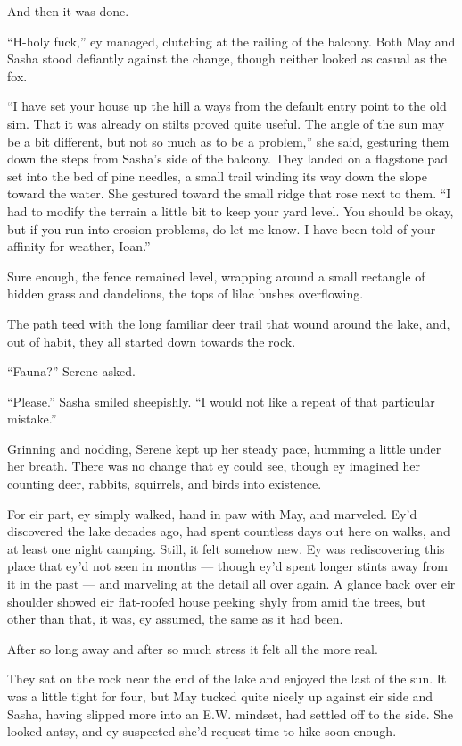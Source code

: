 And then it was done.

``H-holy fuck,'' ey managed, clutching at the railing of the balcony. Both May and Sasha stood defiantly against the change, though neither looked as casual as the fox.

``I have set your house up the hill a ways from the default entry point to the old sim. That it was already on stilts proved quite useful. The angle of the sun may be a bit different, but not so much as to be a problem,'' she said, gesturing them down the steps from Sasha's side of the balcony. They landed on a flagstone pad set into the bed of pine needles, a small trail winding its way down the slope toward the water. She gestured toward the small ridge that rose next to them. ``I had to modify the terrain a little bit to keep your yard level. You should be okay, but if you run into erosion problems, do let me know. I have been told of your affinity for weather, Ioan.''

Sure enough, the fence remained level, wrapping around a small rectangle of hidden grass and dandelions, the tops of lilac bushes overflowing.

The path teed with the long familiar deer trail that wound around the lake, and, out of habit, they all started down towards the rock.

``Fauna?'' Serene asked.

``Please.'' Sasha smiled sheepishly. ``I would not like a repeat of that particular mistake.''

Grinning and nodding, Serene kept up her steady pace, humming a little under her breath. There was no change that ey could see, though ey imagined her counting deer, rabbits, squirrels, and birds into existence.

For eir part, ey simply walked, hand in paw with May, and marveled. Ey'd discovered the lake decades ago, had spent countless days out here on walks, and at least one night camping. Still, it felt somehow new. Ey was rediscovering this place that ey'd not seen in months — though ey'd spent longer stints away from it in the past — and marveling at the detail all over again. A glance back over eir shoulder showed eir flat-roofed house peeking shyly from amid the trees, but other than that, it was, ey assumed, the same as it had been.

After so long away and after so much stress it felt all the more real.

They sat on the rock near the end of the lake and enjoyed the last of the sun. It was a little tight for four, but May tucked quite nicely up against eir side and Sasha, having slipped more into an E.W. mindset, had settled off to the side. She looked antsy, and ey suspected she'd request time to hike soon enough.

